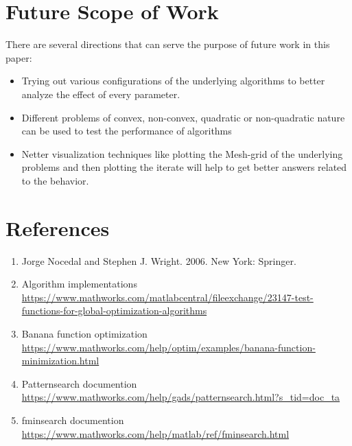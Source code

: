 
\section{Future Scope of Work}
There are several directions that can serve the purpose of future work in this paper:
\begin{itemize}
\item Trying out various configurations of the underlying algorithms to better analyze the effect of every parameter.
\item Different problems of convex, non-convex, quadratic or non-quadratic nature can be used to test the performance of algorithms \item Netter visualization techniques like plotting the Mesh-grid of the underlying problems and then plotting the iterate will help to get better answers related to the behavior.
\end{itemize}


\section{References}

\begin{enumerate}

\item Jorge Nocedal and Stephen J. Wright. 2006.  New York: Springer.

\item Algorithm implementations \url{https://www.mathworks.com/matlabcentral/fileexchange/23147-test-functions-for-global-optimization-algorithms}

\item Banana function optimization \url{https://www.mathworks.com/help/optim/examples/banana-function-minimization.html}

\item Patternsearch documention \url{https://www.mathworks.com/help/gads/patternsearch.html?s_tid=doc_ta}

\item fminsearch documention \url{https://www.mathworks.com/help/matlab/ref/fminsearch.html}

\end{enumerate}